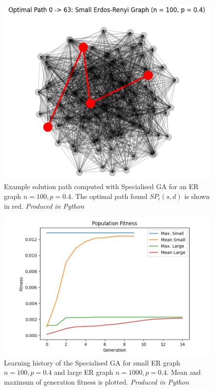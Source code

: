 \documentclass[
	a4paper, %
	10pt, %
	unnumberedsections, %
	twoside, %
]{LTJournalArticle}
\begin{document}
\begin{figure}[H]
	\includegraphics[width=\linewidth]{Figures/sssp/solution.jpg}
	\caption{Example solution path computed with Specialised GA for an ER graph \(n = 100, p = 0.4\). The optimal path found \(SP_{i}(s, d)\) is shown in red. \emph{Produced in Python}}
	\label{fig:sssp_solution}
\end{figure}

\begin{figure}[H]
	\includegraphics[width=\linewidth]{Figures/sssp/history.jpg}
	\caption{Learning history of the Specialised GA for small ER graph \(n = 100, p = 0.4\) and large ER graph \(n = 1000, p = 0.4\). Mean and maximum of generation fitness is plotted. \emph{Produced in Python}}
	\label{fig:sssp_history_1}
\end{figure}
\end{document}

